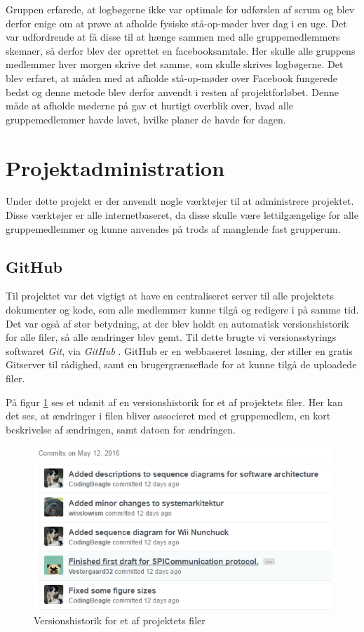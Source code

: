 Gruppen erfarede, at logbøgerne ikke var optimale for udførslen af scrum og blev derfor enige om at prøve at afholde fysiske stå-op-møder hver dag i en uge. Det var udfordrende at få disse til at hænge sammen med alle gruppemedlemmers skemaer, så derfor blev der oprettet en facebooksamtale. Her skulle alle gruppens medlemmer hver morgen skrive det samme, som skulle skrives logbøgerne. Det blev erfaret, at måden med at afholde stå-op-møder over Facebook fungerede bedst og denne metode blev derfor anvendt i resten af projektforløbet. Denne måde at afholde møderne på gav et hurtigt overblik over, hvad alle gruppemedlemmer havde lavet, hvilke planer de havde for dagen. 

\section{Projektadministration}
Under dette projekt er der anvendt nogle værktøjer til at administrere projektet. Disse værktøjer er alle internetbaseret, da disse skulle være lettilgængelige for alle gruppemedlemmer og kunne anvendes på trods af manglende fast grupperum.

\subsection{GitHub}
Til projektet var det vigtigt at have en centraliseret server til alle projektets dokumenter og kode, som alle medlemmer kunne tilgå og redigere i på samme tid. Det var også af stor betydning, at der blev holdt en automatisk versionshistorik for alle filer, så alle ændringer blev gemt. Til dette brugte vi versionsstyrings softwaret \textit{Git}, via \textit{GitHub} \cite{git}. GitHub er en webbaseret løsning, der stiller en gratis Gitserver til rådighed, samt en brugergrænseflade for at kunne tilgå de uploadede filer. \newline

\noindent På figur \ref{ref:GitHubHistorik} ses et udsnit af en versionshistorik for et af projektets filer. Her kan det ses, at ændringer i filen bliver associeret med et gruppemedlem, en kort beskrivelse af ændringen, samt datoen for ændringen.

\begin{figure}[H]
	\centering
	\includegraphics[width=\textwidth]{Projektgennemfoerelse/images/GitHubHistorik}
	\caption{Versionshistorik for et af projektets filer}
	\label{ref:GitHubHistorik}
\end{figure}

